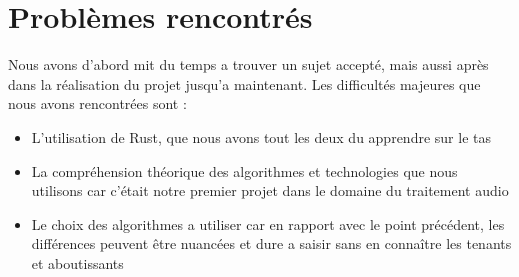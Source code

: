 \documentclass{article}
\begin{document}
\section*{Problèmes rencontrés}
Nous avons d'abord mit du temps a trouver un sujet accepté, mais aussi après dans la réalisation du projet jusqu'a maintenant. Les difficultés majeures que nous avons rencontrées sont :
\begin{itemize}
   \item L'utilisation de Rust, que nous avons tout les deux du apprendre sur le tas
  \item La compréhension théorique des algorithmes et technologies que nous utilisons car c'était notre premier projet dans le domaine du traitement audio
  \item Le choix des algorithmes a utiliser car en rapport avec le point précédent, les différences peuvent être nuancées et dure a saisir sans en connaître les tenants et aboutissants
\end{itemize}
\end{document}
